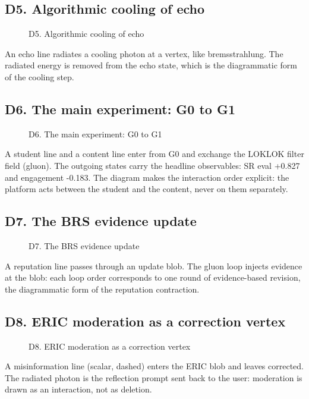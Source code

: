\documentclass[11pt,a4paper]{article}
\begin{document}
\subsection*{D5. Algorithmic cooling of echo}
\begin{figure}[H]
\centering

\caption{D5. Algorithmic cooling of echo}
\end{figure}
An echo line radiates a cooling photon at a vertex, like bremsstrahlung. The radiated energy is removed from the echo state, which is the diagrammatic form of the cooling step.

\subsection*{D6. The main experiment: G0 to G1}
\begin{figure}[H]
\centering

\caption{D6. The main experiment: G0 to G1}
\end{figure}
A student line and a content line enter from G0 and exchange the LOKLOK filter field (gluon). The outgoing states carry the headline observables: SR eval +0.827 and engagement -0.183. The diagram makes the interaction order explicit: the platform acts between the student and the content, never on them separately.

\subsection*{D7. The BRS evidence update}
\begin{figure}[H]
\centering

\caption{D7. The BRS evidence update}
\end{figure}
A reputation line passes through an update blob. The gluon loop injects evidence at the blob: each loop order corresponds to one round of evidence-based revision, the diagrammatic form of the reputation contraction.

\subsection*{D8. ERIC moderation as a correction vertex}
\begin{figure}[H]
\centering

\caption{D8. ERIC moderation as a correction vertex}
\end{figure}
A misinformation line (scalar, dashed) enters the ERIC blob and leaves corrected. The radiated photon is the reflection prompt sent back to the user: moderation is drawn as an interaction, not as deletion.
\end{document}
